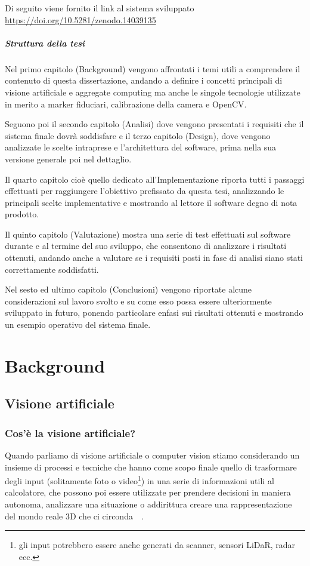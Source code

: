 \documentclass[12pt,a4paper,openright,twoside]{book}
\begin{document}
\begin{center}
	Di seguito viene fornito il link al sistema sviluppato \url{https://doi.org/10.5281/zenodo.14039135}
\end{center}
\paragraph{Struttura della tesi}

Nel primo capitolo (Background) vengono affrontati i temi utili a comprendere il contenuto di questa dissertazione, andando a definire i concetti principali di visione artificiale e aggregate computing ma anche le singole tecnologie utilizzate in merito a marker fiduciari, calibrazione della camera e OpenCV.

Seguono poi il secondo capitolo (Analisi) dove vengono presentati i requisiti che il sistema finale dovrà soddisfare e il terzo capitolo (Design), dove vengono analizzate le scelte intraprese e l'architettura del software, prima nella sua versione generale poi nel dettaglio.

Il quarto capitolo cioè quello dedicato all'Implementazione riporta tutti i passaggi effettuati per raggiungere l'obiettivo prefissato da questa tesi, analizzando le principali scelte implementative e mostrando al lettore il software degno di nota prodotto.

Il quinto capitolo (Valutazione) mostra una serie di test effettuati sul software durante e al termine del suo sviluppo, che consentono di analizzare i risultati ottenuti, andando anche a valutare se i requisiti posti in fase di analisi siano stati correttamente soddisfatti.

Nel sesto ed ultimo capitolo (Conclusioni) vengono riportate alcune considerazioni sul lavoro svolto e su come esso possa essere ulteriormente sviluppato in futuro, ponendo particolare enfasi sui risultati ottenuti e mostrando un esempio operativo del sistema finale.

\chapter{Background}

\section{Visione artificiale}

\subsection{Cos'è la visione artificiale?}
Quando parliamo di visione artificiale o computer vision stiamo considerando un insieme di processi e tecniche che hanno come scopo finale quello di trasformare degli input (solitamente foto o video\footnote{gli input potrebbero essere anche generati da scanner, sensori LiDaR, radar ecc.}) in una serie di informazioni utili al calcolatore, che possono poi essere utilizzate per prendere decisioni in maniera autonoma, analizzare una situazione o addirittura creare una rappresentazione del mondo reale 3D che ci circonda~\cite{bradski2008learning}~\cite{microsoftArtificialVision}.
\end{document}
